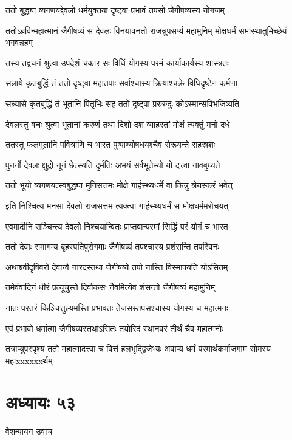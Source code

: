 \twolineshloka
{ततो बुद्ध्या व्यगणयद्देवलो धर्मयुक्तया}
{दृष्ट्वा प्रभावं तपसो जैगीषव्यस्य योगजम्}


\threelineshloka
{ततोऽब्रविन्महात्मानं जैगीषव्यं स देवलः}
{विनयावनतो राजन्नुपसर्प्य महामुनिम्}
{मोक्षधर्मं समास्थातुमिच्छेयं भगवन्नहम्}


\twolineshloka
{तस्य तद्वचनं श्रुत्वा उपदेशं चकार सः}
{विधिं योगस्य परमं कार्याकार्यस्य शास्त्रतः}


\twolineshloka
{सन्नाये कृतबुद्धिं तं ततो दृष्ट्वा महातपाः}
{सर्वाश्चास्य क्रियाश्चक्रे विधिदृष्टेन कर्मणा}


\twolineshloka
{सन्न्यासे कृतबुद्धिं तं भूतानि पितृभिः सह}
{ततो दृष्ट्वा प्ररुरुदुः कोऽस्मान्संविभजिष्यति}


\twolineshloka
{देवलस्तु वचः श्रुत्वा भूतानां करुणं तथा}
{दिशो दश व्याहरतां मोक्षं त्यक्तुं मनो दधे}


\twolineshloka
{ततस्तु फलमूलानि पवित्राणि च भारत}
{पुष्पाण्योषधयश्चैव रोरूयन्ते सहस्रशः}


\twolineshloka
{पुनर्नो देवलः क्षुद्रो नूनं छेत्स्यति दुर्मतिः}
{अभयं सर्वभूतेभ्यो यो दत्त्वा नावबुध्यते}


\twolineshloka
{ततो भूयो व्यगणयत्स्वबुद्ध्या मुनिसत्तमः}
{मोक्षे गार्हस्थ्यधर्मे वा किन्नु श्रेयस्करं भवेत्}


\twolineshloka
{इति निश्चित्य मनसा देवलो राजसत्तम}
{त्यक्त्वा गार्हस्थ्यधर्मं स मोक्षधर्ममरोचयत्}


\twolineshloka
{एवमादीनि सञ्चिन्त्य देवलो निश्चयान्वितः}
{प्राप्तवान्परमां सिद्धिं परं योगं च भारत}


\twolineshloka
{ततो देवाः समागम्य बृहस्पतिपुरोगमाः}
{जैगीषव्यं तपश्चास्य प्रशंसन्ति तपस्विनः}


\twolineshloka
{अथाब्रवीदृषिवरो देवान्वै नारदस्तथा}
{जैगीषव्ये तपो नास्ति विस्मापयति योऽसितम्}


\twolineshloka
{तमेवंवादिनं धीरं प्रत्यूचुस्ते दिवौकसः}
{नैवमित्येव शंसन्तो जैगीषव्यं महामुनिम्}


\twolineshloka
{नातः परतरं किञ्चित्तुल्यमस्ति प्रभावतः}
{तेजसस्तपसश्चास्य योगस्य च महात्मनः}


\twolineshloka
{एवं प्रभावो धर्मात्मा जैगीषव्यस्तथाऽसितः}
{तयोरिदं स्थानवरं तीर्थं चैव महात्मनोः}


\threelineshloka
{तत्राप्युपस्पृश्य ततो महात्मादत्त्वा च वित्तं हलभृद्द्विजेभ्यः}
{अवाप्य धर्मं परमार्थकर्माजगाम सोमस्य महाxxxxxxर्थम्}
{}


\chapter{अध्यायः ५३}
\twolineshloka
{वैशम्पायन उवाच}
{}


